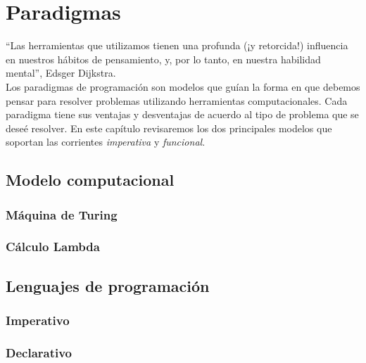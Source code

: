 
\chapter{Paradigmas}

``Las herramientas que utilizamos tienen una profunda (¡y retorcida!) influencia en nuestros hábitos de pensamiento, y, por lo tanto, en nuestra habilidad mental'', Edsger Dijkstra. \\

Los paradigmas de programación son modelos que guían la forma en que debemos pensar para resolver problemas utilizando herramientas computacionales. Cada paradigma tiene sus ventajas y desventajas de acuerdo al tipo de problema que se deseé resolver. En este capítulo revisaremos los dos principales modelos que soportan las corrientes  \emph{imperativa} y \emph{funcional}.

\section{Modelo computacional}



\subsection{Máquina de Turing}

\subsection{Cálculo Lambda}


\section{Lenguajes de programación}

\subsection{Imperativo}

\subsection{Declarativo}